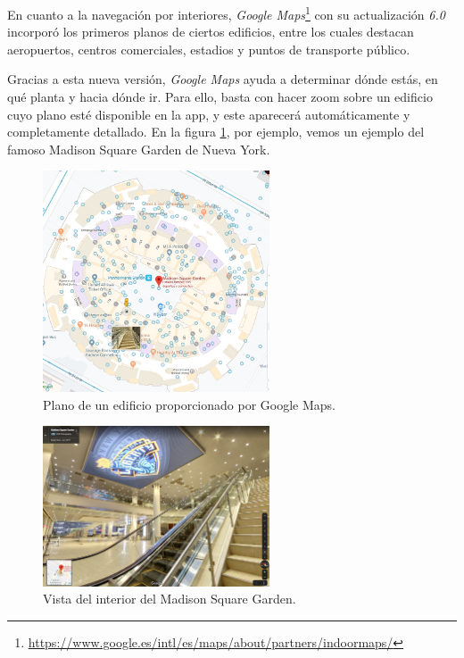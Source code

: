 En cuanto a la navegación por interiores, \textit{Google Maps}\footnote{\url{https://www.google.es/intl/es/maps/about/partners/indoormaps/}} con su actualización \textit{6.0} incorporó los primeros planos de ciertos edificios, entre los cuales destacan aeropuertos, centros comerciales, estadios y puntos de transporte público.

Gracias a esta nueva versión, \textit{Google Maps} ayuda a determinar dónde estás, en qué planta y hacia dónde ir. Para ello, basta con hacer zoom sobre un edificio cuyo plano esté disponible en la app, y este aparecerá automáticamente y completamente detallado. En la figura \ref{fig:ejemplo}, por ejemplo, vemos un ejemplo del famoso Madison Square Garden de Nueva York. 

\begin{figure}[t]
	\centering
	\includegraphics[width=0.6\textwidth]{MadSq2}
	\caption{Plano de un edificio proporcionado por Google Maps.}
	\label{fig:ejemplo}
\end{figure}

\begin{figure}[t]
	\centering
	\includegraphics[width=0.6\textwidth]{MadSq3}
	\caption{Vista del interior del Madison Square Garden. }
	\label{fig:ejemplo2}
\end{figure}

